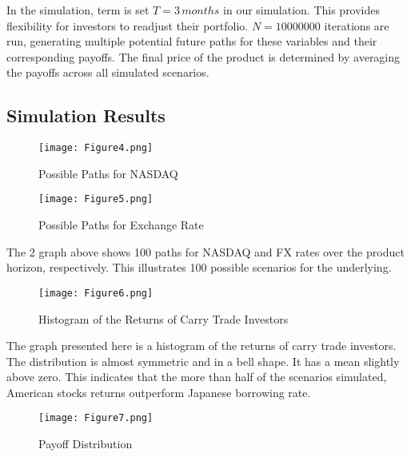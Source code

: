 \documentclass[a4paper, twocolumn]{article}
\begin{document}
In the simulation, term is set $T = 3\,months$ in our simulation. This provides flexibility for investors to readjust their portfolio. $N = 10000000$ iterations are run, generating multiple potential future paths for these variables and their corresponding payoffs. The final price of the product is determined by averaging the payoffs across all simulated scenarios.


\subsection{Simulation Results}

\begin{figure}[ht]
    \begin{center}
    \texttt{[image: Figure4.png]}
    \caption{Possible Paths for NASDAQ}
    \label{fig:picture1}
    \end{center}
\end{figure}

\begin{figure}[ht]
    \begin{center}
    \texttt{[image: Figure5.png]}
    \caption{Possible Paths for Exchange Rate}
    \label{fig:picture1}
    \end{center}
\end{figure}

The 2 graph above shows 100 paths for NASDAQ and FX rates over the product horizon, respectively. This illustrates 100 possible scenarios for the underlying.

\begin{figure}[ht]
    \begin{center}
    \texttt{[image: Figure6.png]}
    \caption{Histogram of the Returns of Carry Trade Investors}
    \label{fig:picture1}
    \end{center}
\end{figure}

The graph presented here is a histogram of the returns of carry trade investors. The distribution is almost symmetric and in a bell shape. It has a mean slightly above zero. This indicates that the more than half of the scenarios simulated, American stocks returns outperform Japanese borrowing rate. 

\begin{figure}[ht]
    \begin{center}
    \texttt{[image: Figure7.png]}
    \caption{Payoff Distribution}
    \label{fig:picture1}
    \end{center}
\end{figure}
\end{document}

